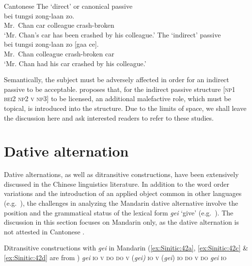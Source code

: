 \documentclass[output=paper,chinesefont,hidelinks]{langscibook}
\begin{document}
\ea%
    \label{ex:Sinitic:41} Cantonese
    \ea\label{ex:Sinitic:41a} The `direct' or canonical passive \\
      bei  tungsi         zong-laan        zo.\\
         {\db}Mr.~Chan  {\CLF}   car   {\PASS}  colleague   crash-broken  \PFV\\
    \glt`Mr. Chan's car has been crashed by his colleague.'
    \ex\label{ex:Sinitic:41b}The `indirect' passive\\
      bei  tungsi        zong-laan      zo  [gaa  ce].\\
         {\db}Mr.~Chan   {\PASS}  colleague  crash-broken  {\PFV}    {\db}{\CLF}   car\\
    \glt`Mr. Chan had his car crashed by his colleague.'
    \z\z

Semantically, the subject must be adversely affected in order for an indirect passive to be acceptable. \citet{Chow2018,Chow2019} proposes that, for the indirect passive structure \textsc{[np1 bei2 np2 v np3]} to be licensed, an additional malefactive role, which must be topical, is introduced into the structure. Due to the limits of space, we shall leave the discussion here and ask interested readers to refer to these studies.

\section{Dative alternation}
\label{sec:Sinitic:4.2}

Dative alternations, as well as ditransitive constructions, have been extensively discussed in the Chinese linguistics literature. In addition to the word order variations and the introduction of an applied object common in other languages (e.g.\ \citealt{Bresnan07predicting}), the challenges in analyzing the Mandarin dative alternative involve the position and the grammatical status of the lexical form \textit{gei} `give' (e.g.\ \citealt{Chao1968,Zhu1982}). The discussion in this section focuses on Mandarin only, as the dative alternation is not attested in Cantonese \citep{Lam2008}.

\ea%
    \label{ex:Sinitic:42}
    Ditransitive constructions with \textit{gei} in Mandarin (\ref{ex:Sinitic:42a}, \ref{ex:Sinitic:42c} \& \ref{ex:Sinitic:42d} are from \citealt{HuangAhrens1999})
\ea\label{ex:Sinitic:42a} {\SUBJ} \textit{gei}  \textsc{io v do}
\ex\label{ex:Sinitic:42b} {\SUBJ} \textsc{do} \textsc{v} (\textit{gei)} \textsc{io}
\ex\label{ex:Sinitic:42c} {\SUBJ} \textsc{v} (\textit{gei}) \textsc{io} \textsc{do}
\ex\label{ex:Sinitic:42d} {\SUBJ} \textsc{v} \textsc{do} \textit{gei} \textsc{io}
\z\z
\end{document}
